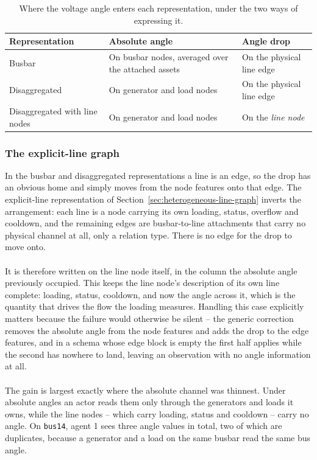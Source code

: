 \begin{table}[H]
  \centering
  \small
  \caption{Where the voltage angle enters each representation, under the two
  ways of expressing it.}
  \label{tab:angle-placement}
  \setlength{\tabcolsep}{4pt}
  \begin{tabular}{L{0.26\textwidth}L{0.30\textwidth}L{0.34\textwidth}}
    \toprule
    Representation & Absolute angle & Angle drop \\
    \midrule
    Busbar & On busbar nodes, averaged over the attached assets &
    On the physical line edge \\
    Disaggregated & On generator and load nodes &
    On the physical line edge \\
    Disaggregated with line nodes & On generator and load nodes &
    On the \emph{line node} \\
    \bottomrule
  \end{tabular}
\end{table}

\subsubsection{The explicit-line graph}

In the busbar and disaggregated representations a line is an edge, so the drop
has an obvious home and simply moves from the node features onto that edge. The
explicit-line representation of Section~\ref{sec:heterogeneous-line-graph}
inverts the arrangement: each line is a node carrying its own loading, status,
overflow and cooldown, and the remaining edges are busbar-to-line attachments
that carry no physical channel at all, only a relation type. There is no edge
for the drop to move onto.
\\
\\
It is therefore written on the line node itself, in the column the absolute
angle previously occupied. This keeps the line node's description of its own
line complete: loading, status, cooldown, and now the angle across it, which is
the quantity that drives the flow the loading measures. Handling this case
explicitly matters because the failure would otherwise be silent -- the generic
correction removes the absolute angle from the node features and adds the drop
to the edge features, and in a schema whose edge block is empty the first half
applies while the second has nowhere to land, leaving an observation with no
angle information at all.
\\
\\
The gain is largest exactly where the absolute channel was thinnest. Under
absolute angles an actor reads them only through the generators and loads it
owns, while the line nodes -- which carry loading, status and cooldown -- carry
no angle. On \texttt{bus14}, agent 1 sees three angle values in total, two of
which are duplicates, because a generator and a load on the same busbar read the
same bus angle.

